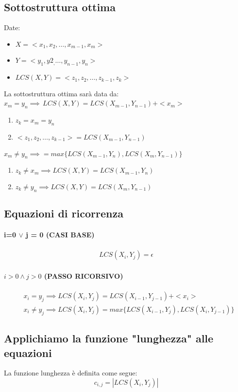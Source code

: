 \subsection{Sottostruttura ottima}
Date:
\begin{itemize}
    \item $X=<x_1, x_2, \dots, x_{m-1}, x_m>$
    \item $Y=<y_1, y2_, \dots, y_{n-1}, y_n>$ 
    \item $LCS(X, Y) = <z_1, z_2, \dots, z_{k-1}, z_k>$
\end{itemize}
La sottostruttura ottima sarà data da:\\
$x_m = y_n \implies \, LCS(X,Y) = LCS(X_{m-1},Y_{n-1})+<x_m>$
\begin{enumerate}
    \item $z_k = x_m = y_n$
    \item $<z_1, z_2, \dots, z_{k-1}> = LCS(X_{m-1}, Y_{n-1})$
\end{enumerate}
$x_m \neq y_n \implies = max\{LCS(X_{m-1}, Y_n), LCS(X_m, Y_{n-1})\}$
\begin{enumerate}
    \item $z_k \neq x_m \implies LCS(X,Y)=LCS(X_{m-1},Y_n)$
    \item $z_k \neq y_n \implies LCS(X,Y)=LCS(X_m, Y_{n-1})$
\end{enumerate}
\subsection{Equazioni di ricorrenza}
\paragraph*{i=0 $\vee$ j = 0 (CASI BASE)}
\begin{align*}
    LCS(X_i, Y_j) = \epsilon
\end{align*}
\paragraph*{$i > 0 \wedge j>0$ (PASSO RICORSIVO)}
\begin{align*}
    &x_i = y_j \implies LCS(X_i, Y_j) = LCS(X_{i-1}, Y_{j-1}) + <x_i>\\
    &x_i \neq y_j \implies LCS(X_i, Y_j) = max\{LCS(X_{i-1}, Y_j), LCS(X_i, Y_{j-1})\}
\end{align*}
\subsection*{Applichiamo la funzione "lunghezza" alle equazioni}
La funzione lunghezza è definita come segue:
\[c_{i,j} = |LCS(X_i, Y_j)|\]
